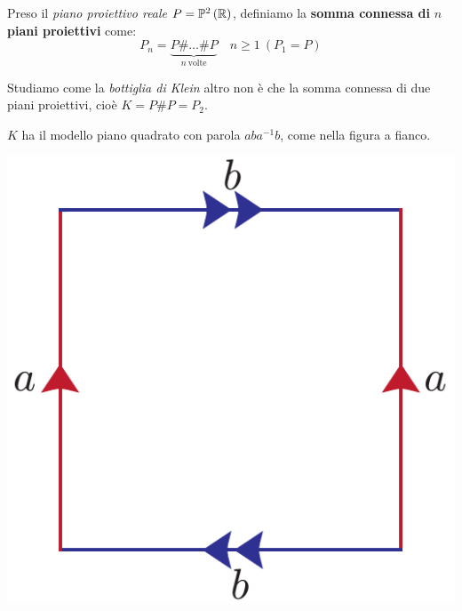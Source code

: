\begin{define}
	Preso il \textit{piano proiettivo reale} $P=\proj[2]{\realset}$, definiamo la \textbf{somma connessa di} $n$ \textbf{piani proiettivi} come:
	\begin{equation*}
		P_n=\underbrace{P\# \ldots\# P}_{n\ \text{volte}}\quad n\geq 1\ \left(P_1=P\right)
	\end{equation*}
\vspace{-3mm}
\end{define}
\begin{observe}	Studiamo come la \textit{bottiglia di Klein} altro non è che la somma connessa di due piani proiettivi, cioè $K=P\# P=P_2$.\\
	\begin{minipage}{.75\linewidth}
		$K$ ha il modello piano quadrato con parola $aba^{-1}b$, come nella figura a fianco.
	\end{minipage}
	\begin{minipage}{.24\linewidth}
		\begin{center}
			\includegraphics[trim=0cm 0cm 0cm 0cm, clip, scale=0.3]{images/klein.pdf}
		\end{center}
	\end{minipage}\\
	\begin{minipage}{.75\linewidth}

\end{minipage}
\end{observe}
